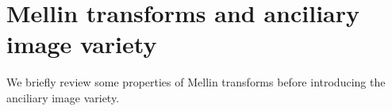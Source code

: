 \documentclass[a4paper,10pt]{amsart}
\theoremstyle{definition}
\theoremstyle{remark}
\numberwithin{equation}{section}
\newcommand{\m}{\mathfrak{m}}
\newcommand{\note}[1]{{\color{blue}   #1}}
\newcommand{\ff}{\mathfrak{f}}
\newcommand{\0}{\color{blue}{\mathsf{0}}}
\begin{document}
 
 
 
 
 
  
  
 
  
 \section{Mellin transforms and anciliary image variety} \label{setup}
We briefly review some properties of Mellin transforms before introducing the anciliary image variety. 
\end{document}
